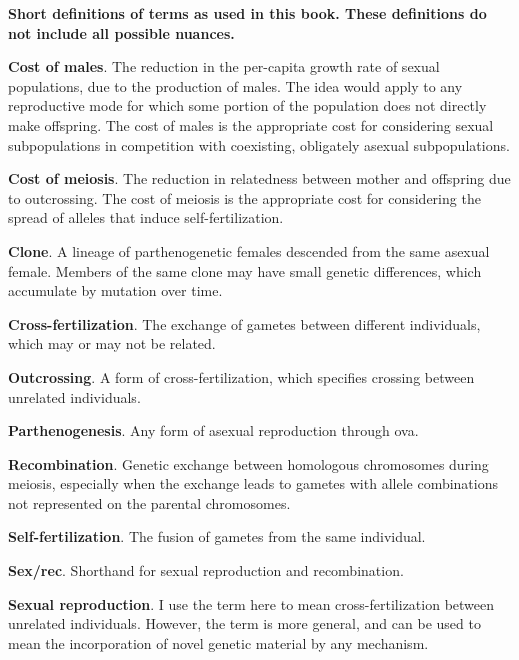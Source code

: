 \documentclass[
  letterpaper,
]{book}
\begin{document}
\begin{tcolorbox}[enhanced jigsaw, title=\textcolor{quarto-callout-tip-color}{\faLightbulb}\hspace{0.5em}{Box 1.1}, colbacktitle=quarto-callout-tip-color!10!white, opacitybacktitle=0.6, leftrule=.75mm, left=2mm, bottomtitle=1mm, coltitle=black, colback=white, breakable, toptitle=1mm, toprule=.15mm, titlerule=0mm, rightrule=.15mm, arc=.35mm, opacityback=0, bottomrule=.15mm, colframe=quarto-callout-tip-color-frame]

\textbf{Short definitions of terms as used in this book. These
definitions do not include all possible nuances.}

\textbf{Cost of males}. The reduction in the per-capita growth rate of
sexual populations, due to the production of males. The idea would apply
to any reproductive mode for which some portion of the population does
not directly make offspring. The cost of males is the appropriate cost
for considering sexual subpopulations in competition with coexisting,
obligately asexual subpopulations.

\textbf{Cost of meiosis}. The reduction in relatedness between mother
and offspring due to outcrossing. The cost of meiosis is the appropriate
cost for considering the spread of alleles that induce
self-fertilization.

\textbf{Clone}. A lineage of parthenogenetic females descended from the
same asexual female. Members of the same clone may have small genetic
differences, which accumulate by mutation over time.

\textbf{Cross-fertilization}. The exchange of gametes between different
individuals, which may or may not be related.

\textbf{Outcrossing}. A form of cross-fertilization, which specifies
crossing between unrelated individuals.

\textbf{Parthenogenesis}. Any form of asexual reproduction through ova.

\textbf{Recombination}. Genetic exchange between homologous chromosomes
during meiosis, especially when the exchange leads to gametes with
allele combinations not represented on the parental chromosomes.

\textbf{Self-fertilization}. The fusion of gametes from the same
individual.

\textbf{Sex/rec}. Shorthand for sexual reproduction and recombination.

\textbf{Sexual reproduction}. I use the term here to mean
cross-fertilization between unrelated individuals. However, the term is
more general, and can be used to mean the incorporation of novel genetic
material by any mechanism.

\end{tcolorbox}
\end{document}
